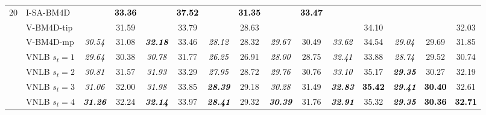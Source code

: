 \documentclass[10pt, a4paper]{article}
\newcommand{\bsic}[1]{\textcolor{black}{\textit{#1}}}
\newcommand{\Bsic}[1]{\textcolor{black}{\textbf{\textit{#1}}}}
\newcommand{\Best}[1]{\textbf{\textcolor{black}{#1}}}
\begin{document}
\begin{landscape}
\begin{table}[htp!]
\begin{center}
{\begin{tabular}{ c | l |c c | c c | c c | c c | c c | c c | c }
%
			\multirow{1}{*}{$20$}
			                      & I-SA-BM4D            & \bsic{     } & \Best{33.36} & \bsic{     } & \Best{37.52}  & \bsic{     } & \Best{31.35}  & \bsic{     } & \Best{33.47} &              &               &              &              &              \\
			                      & V-BM4D-tip           & \bsic{     } &       31.59  & \bsic{     } &       33.79   & \bsic{     } &       28.63   &              &              &              &       34.10   &              &              &       32.03  \\
			                      & V-BM4D-mp            & \bsic{30.54} &       31.08  & \Bsic{32.18} &       33.46   & \bsic{28.12} &       28.32   & \bsic{29.67} &       30.49  & \bsic{33.62} &       34.54   & \bsic{29.04} &       29.69  &       31.85  \\
			                      & VNLB   $s_t = 1$     & \bsic{29.64} &       30.38  & \bsic{30.78} &       31.77   & \bsic{26.25} &       26.91   & \bsic{28.00} &       28.75  & \bsic{32.41} &       33.88   & \bsic{28.74} &       29.52  &       30.74  \\
			                      & VNLB   $s_t = 2$     & \bsic{30.81} &       31.57  & \bsic{31.93} &       33.29   & \bsic{27.95} &       28.72   & \bsic{29.76} &       30.76  & \bsic{33.10} &       35.17   & \Bsic{29.35} &       30.27  &       32.19  \\
			                      & VNLB   $s_t = 3$     & \bsic{31.06} &       32.00  & \bsic{31.98} &       33.85   & \Bsic{28.39} &       29.18   & \bsic{30.28} &       31.49  & \Bsic{32.83} & \Best{35.42}  & \Bsic{29.41} & \Best{30.40} &      {32.61} \\
			                      & VNLB   $s_t = 4$     & \Bsic{31.26} &       32.24  & \Bsic{32.14} &       33.97   & \Bsic{28.41} &       29.32   & \Bsic{30.39} &       31.76  & \Bsic{32.91} &      {35.32}  & \Bsic{29.35} & \Best{30.36} & \Best{32.71} \\\hline

\end{tabular}}
\end{center}
\end{table}
\end{landscape}
\end{document}
